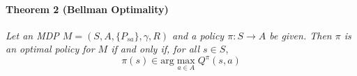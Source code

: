 \documentclass[12pt,a4paper]{article}
\begin{document}
\paragraph{Theorem 2 (Bellman Optimality)} \textit{Let an MDP $M = (S, A, \{P_{sa}\}, \gamma, R)$ and a policy $\pi : S \rightarrow A$ be given. Then $\pi$ is an optimal policy for $M$ if and only if, for all $s \in S$},
\begin{equation}
	\pi(s) \in \text{arg} \max\limits_{a \in A}Q^{\pi}(s,a)
\end{equation}
%


\end{document}
